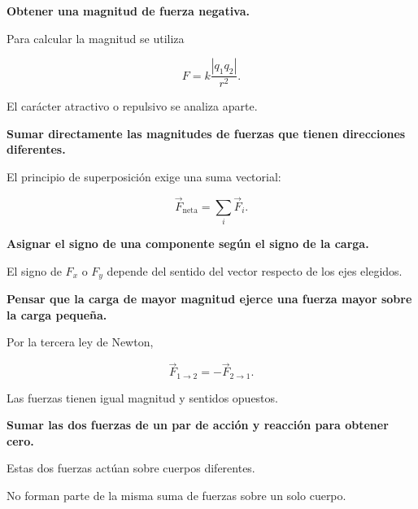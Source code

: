 \begin{errorfrecuente}

\textbf{Obtener una magnitud de fuerza negativa.}

Para calcular la magnitud se utiliza

\[
F
=
k\frac{|q_1q_2|}{r^2}.
\]

El carácter atractivo o repulsivo se analiza aparte.

\end{errorfrecuente}


\begin{errorfrecuente}

\textbf{Sumar directamente las magnitudes de fuerzas que tienen direcciones
diferentes.}

El principio de superposición exige una suma vectorial:

\[
\vec{F}_{\text{neta}}
=
\sum_i\vec{F}_i.
\]

\end{errorfrecuente}


\begin{errorfrecuente}

\textbf{Asignar el signo de una componente según el signo de la carga.}

El signo de \(F_x\) o \(F_y\) depende del sentido del vector respecto de los
ejes elegidos.

\end{errorfrecuente}


\begin{errorfrecuente}

\textbf{Pensar que la carga de mayor magnitud ejerce una fuerza mayor sobre
la carga pequeña.}

Por la tercera ley de Newton,

\[
\vec{F}_{1\to2}
=
-\vec{F}_{2\to1}.
\]

Las fuerzas tienen igual magnitud y sentidos opuestos.

\end{errorfrecuente}


\begin{errorfrecuente}

\textbf{Sumar las dos fuerzas de un par de acción y reacción para obtener
cero.}

Estas dos fuerzas actúan sobre cuerpos diferentes.

No forman parte de la misma suma de fuerzas sobre un solo cuerpo.

\end{errorfrecuente}


